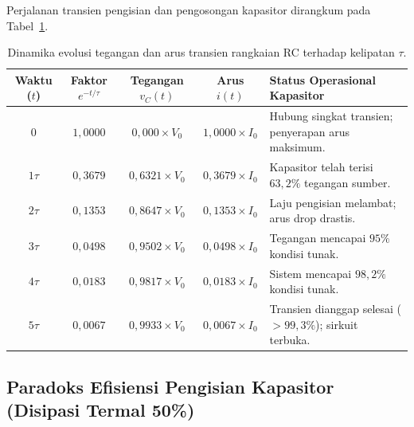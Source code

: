 \documentclass[11pt,a4paper]{article}
\theoremstyle{definition}
\begin{document}
Perjalanan transien pengisian dan pengosongan kapasitor dirangkum pada Tabel~\ref{tab:transient_rc_evolution}.

\begin{table}[htbp]
\centering
\caption{Dinamika evolusi tegangan dan arus transien rangkaian RC terhadap kelipatan $\tau$.}
\label{tab:transient_rc_evolution}
\begin{tabularx}{\textwidth}{cccc>{\raggedright\arraybackslash}X}
\toprule
\textbf{Waktu ($t$)} & \textbf{Faktor $e^{-t/\tau}$} & \textbf{Tegangan $v_C(t)$} & \textbf{Arus $i(t)$} & \textbf{Status Operasional Kapasitor} \\ \midrule
$0$ & $1{,}0000$ & $0{,}000 \times V_0$ & $1{,}0000 \times I_0$ & Hubung singkat transien; penyerapan arus maksimum. \\
$1\tau$ & $0{,}3679$ & $0{,}6321 \times V_0$ & $0{,}3679 \times I_0$ & Kapasitor telah terisi $63{,}2\%$ tegangan sumber. \\
$2\tau$ & $0{,}1353$ & $0{,}8647 \times V_0$ & $0{,}1353 \times I_0$ & Laju pengisian melambat; arus drop drastis. \\
$3\tau$ & $0{,}0498$ & $0{,}9502 \times V_0$ & $0{,}0498 \times I_0$ & Tegangan mencapai $95\%$ kondisi tunak. \\
$4\tau$ & $0{,}0183$ & $0{,}9817 \times V_0$ & $0{,}0183 \times I_0$ & Sistem mencapai $98{,}2\%$ kondisi tunak. \\
$5\tau$ & $0{,}0067$ & $0{,}9933 \times V_0$ & $0{,}0067 \times I_0$ & Transien dianggap selesai ($>99{,}3\%$); sirkuit terbuka. \\ \bottomrule
\end{tabularx}
\end{table}

\subsection{Paradoks Efisiensi Pengisian Kapasitor (Disipasi Termal 50\%)}
\end{document}
